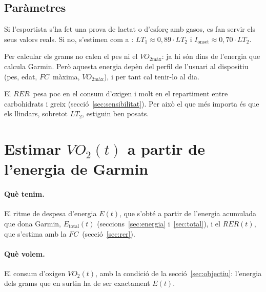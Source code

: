 \documentclass[10pt,a4paper]{article}
\newcommand{\sub}[1]{{\scriptscriptstyle\mathrm{#1}}}   %
\newcommand{\tot}{\sub{total}}
\newcommand{\smax}{{\scriptscriptstyle\text{màx}}}
\newcommand{\VO}{\ensuremath{\mathit{VO}_2}}               %
\newcommand{\VOmax}{\ensuremath{\mathit{VO}_{2\smax}}}
\newcommand{\RER}{\ensuremath{\mathit{RER}}}
\newcommand{\FC}{\ensuremath{\mathit{FC}}}
\newcommand{\Ion}{\ensuremath{I_{\mathrm{onset}}}}
\begin{document}
\subsection{Paràmetres}\label{sec:parametres}
Si l'esportista s'ha fet una prova de lactat o d'esforç amb gasos, es fan servir els seus
valors reals. Si no, s'estimen com a \citep{chofatfc2026}: $LT_1\approx0{,}89\cdot LT_2$ i
$\Ion\approx0{,}70\cdot LT_2$.

Per calcular els grams no calen el pes ni el $\VOmax$: ja hi són dins de l'energia que
calcula Garmin. Però aquesta energia depèn del perfil de l'usuari al dispositiu (pes,
edat, \FC\ màxima, $\VOmax$), i per tant cal tenir-lo al dia.

El \RER\ pesa poc en el consum d'oxigen i molt en el repartiment entre carbohidrats i greix
(secció~\ref{sec:sensibilitat}). Per això el que més importa és que els llindars, sobretot
$LT_2$, estiguin ben posats.

\section{Estimar \texorpdfstring{$\mathit{VO}_2(t)$}{VO2(t)} a partir de l'energia de Garmin}\label{sec:vo2}

\paragraph{Què tenim.} El ritme de despesa d'energia $E(t)$, que s'obté a partir de
l'energia acumulada que dona Garmin, $E_{\tot}(t)$ (seccions~\ref{sec:energia}
i~\ref{sec:total}), i el $\RER(t)$, que s'estima amb la \FC\ (secció~\ref{sec:rer}).

\paragraph{Què volem.} El consum d'oxigen $\VO(t)$, amb la condició de la
secció~\ref{sec:objectiu}: l'energia dels grams que en surtin ha de ser exactament $E(t)$.
\end{document}
